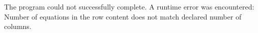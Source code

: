 The program could not successfully complete.
A runtime error was encountered:
Number of equations in the row content does not match declared number of columns.
